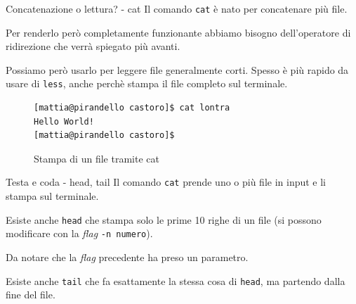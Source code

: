 \begin{frame}[fragile]{Concatenazione o lettura? - cat}
  Il comando \texttt{cat} è nato per concatenare più file.\bigskip

  Per renderlo però completamente funzionante abbiamo bisogno dell'operatore
  di ridirezione che verrà spiegato più avanti.\bigskip

  Possiamo però usarlo per leggere file generalmente corti. Spesso è più rapido
  da usare di \texttt{less}, anche perchè stampa il file completo sul terminale. \bigskip

  \begin{figure}
    \begin{lstlisting}[basicstyle=\footnotesize]
[mattia@pirandello castoro]$ cat lontra
Hello World!
[mattia@pirandello castoro]$
    \end{lstlisting}
      \caption{Stampa di un file tramite cat}
  \end{figure}
\end{frame}

\begin{frame}{Testa e coda - head, tail}
  Il comando \texttt{cat} prende uno o più file in input e li stampa sul 
  terminale.\bigskip

  Esiste anche \texttt{head} che stampa solo le prime 10 righe di un file (si
  possono modificare con la \textit{flag} \texttt{-n numero}).\medskip

  Da notare che la \textit{flag} precedente ha preso un parametro.\bigskip

  Esiste anche \texttt{tail} che fa esattamente la stessa cosa di \texttt{head}, 
  ma partendo dalla fine del file.
\end{frame}
